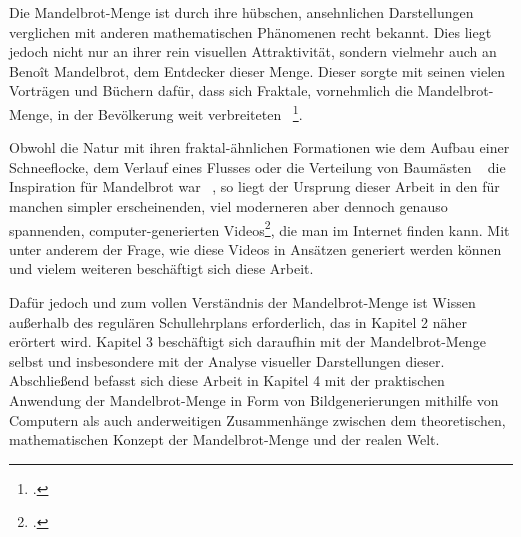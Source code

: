 
Die Mandelbrot-Menge ist durch ihre hübschen, ansehnlichen Darstellungen verglichen
mit anderen mathematischen Phänomenen recht bekannt.
Dies liegt jedoch nicht nur an ihrer rein visuellen Attraktivität,
sondern vielmehr auch an Benoît Mandelbrot, dem Entdecker dieser Menge.
Dieser sorgte mit seinen vielen Vorträgen und Büchern dafür, dass sich Fraktale,
vornehmlich die Mandelbrot-Menge, in der Bevölkerung weit verbreiteten
~\footcite[Vgl. letzten Absatz]{ibm_fractal_2011}.

Obwohl die Natur mit ihren fraktal-ähnlichen Formationen wie dem Aufbau einer
Schneeflocke, dem Verlauf eines Flusses oder die Verteilung von Baumästen
~\cite{nnart_fractals_nodate} die Inspiration für Mandelbrot war
~\cite{zink_kosmische_2014}, so liegt der Ursprung dieser Arbeit in den für
manchen simpler erscheinenden, viel moderneren aber dennoch genauso spannenden,
computer-generierten Videos\footcite[Vgl. bspw.][]{maths_town_eye_2017},
die man im Internet finden kann.
Mit unter anderem der Frage, wie diese Videos in Ansätzen generiert werden können
und vielem weiteren beschäftigt sich diese Arbeit.

Dafür jedoch und zum vollen Verständnis der Mandelbrot-Menge ist Wissen außerhalb
des regulären Schullehrplans erforderlich, das in Kapitel 2 näher erörtert wird.
Kapitel 3 beschäftigt sich daraufhin mit der Mandelbrot-Menge selbst und insbesondere
mit der Analyse visueller Darstellungen dieser.
Abschließend befasst sich diese Arbeit in Kapitel 4 mit der praktischen Anwendung
der Mandelbrot-Menge in Form von Bildgenerierungen mithilfe von Computern als auch
anderweitigen Zusammenhänge zwischen dem theoretischen, mathematischen Konzept
der Mandelbrot-Menge und der realen Welt.